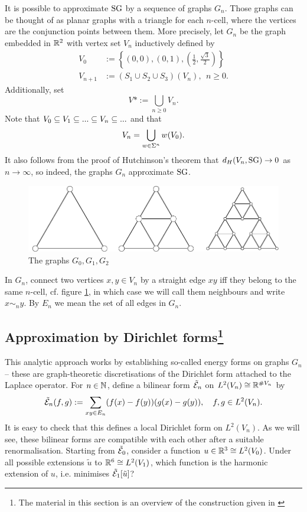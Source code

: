 It is possible to approximate $\operatorname{SG}$ by a sequence of graphs $G_n$. Those graphs can be thought of as planar graphs with a triangle for each $n$-cell, where the vertices are the conjunction points between them. More precisely, let $G_n$ be the graph embedded in $\mathbb{R}^2$ with vertex set $V_n$ inductively defined by
\begin{align*}
  V_0&:=
  \left\{(0,0),(0,1),\left(\frac{1}{2},\frac{\sqrt{3}}{2}\right)\right\}\\
  V_{n+1}&:=(S_1\cup S_2\cup S_3)(V_n),\ \ n\geq0.
\end{align*}
Additionally, set 
\[
  V*:=\bigcup_{n\geq0} V_n.
\]
Note that $V_0\subseteq V_1\subseteq...\subseteq V_n\subseteq ...$ and that
\[
  V_n=\bigcup_{w\in\Sigma^n} w(V_0).
\]
It also follows from the proof of Hutchinson's theorem that 
$d_H(V_n,\operatorname{SG})\to 0$ as $n\to\infty$, so indeed, the graphs $G_n$ approximate $\operatorname{SG}$. 

\begin{figure}[h]
\centering
\includegraphics[scale=1]{gn.pdf}
\caption{The graphs $G_0,G_1,G_2$}\label{fig:gn}
\end{figure}

In $G_n$, connect two vertices $x,y\in V_n$ by a straight edge $xy$ iff they belong to the same $n$-cell, cf. figure \ref{fig:gn}, in which case we will call them neighbours and write $x\sim_n y$. By $E_n$ we mean the set of all edges in $G_n$. 



\subsection[Approximation by Dirichlet forms]{Approximation by Dirichlet forms\protect\footnote{The material in this section is an overview of the construction given in \cite[chapter I]{strichartz2006differential}}}

This analytic approach works by establishing so-called energy forms on graphs $G_n$ -- these are graph-theoretic discretisations of the Dirichlet form attached to the Laplace operator. For $n\in\mathbb{N}$, define a bilinear form $\tilde{\mathcal{E}}_n$ on $L^2(V_n)\cong \mathbb{R}^{\# V_n}$ by 
\[
  \tilde{\mathcal{E}}_n(f,g):=\sum_{xy\in E_n}(f(x)-f(y))(g(x)-g(y)), 
  \ \ \ f,g\in L^2(V_n).
\]
It is easy to check that this defines a local Dirichlet form on $L^2(V_n)$. As we will see, these bilinear forms are compatible with each other after a suitable renormalisation. Starting from $\tilde{\mathcal{E}}_0$, consider a function 
$u\in\mathbb{R}^3\cong L^2(V_0)$. Under all possible extensions 
$\tilde u$ to $\mathbb{R}^6\cong L^2(V_1)$, which function is the harmonic extension of $u$, i.e. minimises $\tilde{\mathcal{E}}_1[\tilde u]$? 

